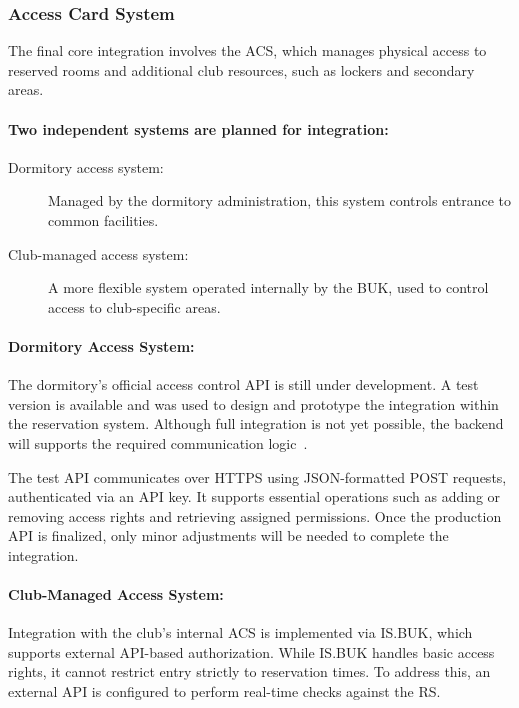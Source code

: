\subsubsection{Access Card System}

The final core integration involves the ACS, which manages physical access to reserved rooms and additional club resources, such as lockers and secondary areas.

\paragraph{Two independent systems are planned for integration:}

\begin{description}
  \item[Dormitory access system:] Managed by the dormitory administration, this system controls entrance to common facilities.
  \item[Club-managed access system:] A more flexible system operated internally by the BUK, used to control access to club-specific areas.
\end{description}

\paragraph{Dormitory Access System:}
The dormitory's official access control API is still under development. A test version is available and was used to design and prototype the integration within the reservation system. Although full integration is not yet possible, the backend will supports the required communication logic~\cite{APIdormitoryACS}.

The test API communicates over HTTPS using JSON-formatted POST requests, authenticated via an API key. It supports essential operations such as adding or removing access rights and retrieving assigned permissions. Once the production API is finalized, only minor adjustments will be needed to complete the integration.

\paragraph{Club-Managed Access System:}
Integration with the club’s internal ACS is implemented via IS.BUK, which supports external API-based authorization. While IS.BUK handles basic access rights, it cannot restrict entry strictly to reservation times. To address this, an external API is configured to perform real-time checks against the RS.

